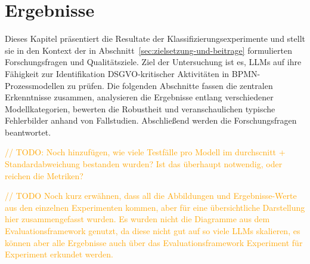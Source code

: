 \chapter{Ergebnisse}\label{ch:ergebnisse}

Dieses Kapitel präsentiert die Resultate der Klassifizierungsexperimente und stellt sie in den Kontext der in Abschnitt~\ref{sec:zielsetzung-und-beitrage} formulierten Forschungsfragen und Qualitätsziele. Ziel der Untersuchung ist es, \acp{LLM} auf ihre Fähigkeit zur Identifikation \ac{DSGVO}-kritischer Aktivitäten in \ac{BPMN}-Prozessmodellen zu prüfen. Die folgenden Abschnitte fassen die zentralen Erkenntnisse zusammen, analysieren die Ergebnisse entlang verschiedener Modellkategorien, bewerten die Robustheit und veranschaulichen typische Fehlerbilder anhand von Fallstudien. Abschließend werden die Forschungsfragen beantwortet.

\textcolor{orange}{// TODO: Noch hinzufügen, wie viele Testfälle pro Modell im durchscnitt + Standardabweichung bestanden wurden? Ist das überhaupt notwendig, oder reichen die Metriken?}

\textcolor{orange}{// TODO Noch kurz erwähnen, dass all die Abbildungen und Ergebnisse-Werte aus den einzelnen Experimenten kommen, aber für eine übersichtliche Darstellung hier zusammengefasst wurden. Es wurden nicht die Diagramme aus dem Evaluationsframework genutzt, da diese nicht gut auf so viele LLMs skalieren, es können aber alle Ergebnisse auch über das Evaluationsframework Experiment für Experiment erkundet werden.}






